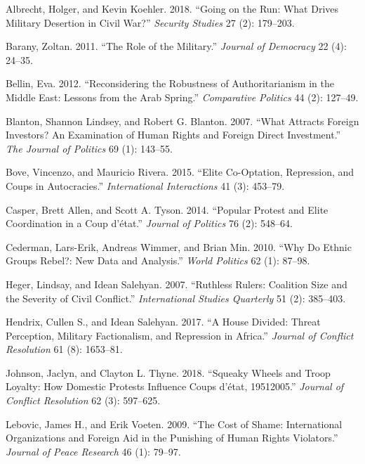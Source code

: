 \documentclass[12pt,]{article}
\begin{document}
\leavevmode\hypertarget{ref-Albrecht2018}{}%
Albrecht, Holger, and Kevin Koehler. 2018. ``Going on the Run: What Drives Military Desertion in Civil War?'' \emph{Security Studies} 27 (2): 179--203.

\leavevmode\hypertarget{ref-Barany2011}{}%
Barany, Zoltan. 2011. ``The Role of the Military.'' \emph{Journal of Democracy} 22 (4): 24--35.

\leavevmode\hypertarget{ref-Bellin2012}{}%
Bellin, Eva. 2012. ``Reconsidering the Robustness of Authoritarianism in the Middle East: Lessons from the Arab Spring.'' \emph{Comparative Politics} 44 (2): 127--49.

\leavevmode\hypertarget{ref-Blanton2007}{}%
Blanton, Shannon Lindsey, and Robert G. Blanton. 2007. ``What Attracts Foreign Investors? An Examination of Human Rights and Foreign Direct Investment.'' \emph{The Journal of Politics} 69 (1): 143--55.

\leavevmode\hypertarget{ref-Bove2015a}{}%
Bove, Vincenzo, and Mauricio Rivera. 2015. ``Elite Co-Optation, Repression, and Coups in Autocracies.'' \emph{International Interactions} 41 (3): 453--79.

\leavevmode\hypertarget{ref-Casper2014}{}%
Casper, Brett Allen, and Scott A. Tyson. 2014. ``Popular Protest and Elite Coordination in a Coup d'état.'' \emph{Journal of Politics} 76 (2): 548--64.

\leavevmode\hypertarget{ref-Cederman2010}{}%
Cederman, Lars-Erik, Andreas Wimmer, and Brian Min. 2010. ``Why Do Ethnic Groups Rebel?: New Data and Analysis.'' \emph{World Politics} 62 (1): 87--98.

\leavevmode\hypertarget{ref-Heger2007a}{}%
Heger, Lindsay, and Idean Salehyan. 2007. ``Ruthless Rulers: Coalition Size and the Severity of Civil Conflict.'' \emph{International Studies Quarterly} 51 (2): 385--403.

\leavevmode\hypertarget{ref-Hendrix2017}{}%
Hendrix, Cullen S., and Idean Salehyan. 2017. ``A House Divided: Threat Perception, Military Factionalism, and Repression in Africa.'' \emph{Journal of Conflict Resolution} 61 (8): 1653--81.

\leavevmode\hypertarget{ref-Johnson2018}{}%
Johnson, Jaclyn, and Clayton L. Thyne. 2018. ``Squeaky Wheels and Troop Loyalty: How Domestic Protests Influence Coups d'état, 19512005.'' \emph{Journal of Conflict Resolution} 62 (3): 597--625.

\leavevmode\hypertarget{ref-Lebovic2009}{}%
Lebovic, James H., and Erik Voeten. 2009. ``The Cost of Shame: International Organizations and Foreign Aid in the Punishing of Human Rights Violators.'' \emph{Journal of Peace Research} 46 (1): 79--97.
\end{document}
